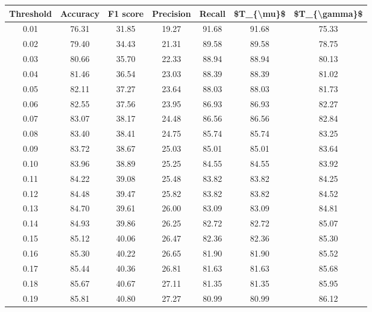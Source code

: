 \begin{tabular}{|c|c|c|c|c|c|c|}
\hline
 Threshold &  Accuracy &  F1 score &  Precision &  Recall &  \$T\_\{\textbackslash mu\}\$ &  \$T\_\{\textbackslash gamma\}\$ \\
\hline
      0.01 &     76.31 &     31.85 &      19.27 &   91.68 &      91.68 &         75.33 \\
      0.02 &     79.40 &     34.43 &      21.31 &   89.58 &      89.58 &         78.75 \\
      0.03 &     80.66 &     35.70 &      22.33 &   88.94 &      88.94 &         80.13 \\
      0.04 &     81.46 &     36.54 &      23.03 &   88.39 &      88.39 &         81.02 \\
      0.05 &     82.11 &     37.27 &      23.64 &   88.03 &      88.03 &         81.73 \\
      0.06 &     82.55 &     37.56 &      23.95 &   86.93 &      86.93 &         82.27 \\
      0.07 &     83.07 &     38.17 &      24.48 &   86.56 &      86.56 &         82.84 \\
      0.08 &     83.40 &     38.41 &      24.75 &   85.74 &      85.74 &         83.25 \\
      0.09 &     83.72 &     38.67 &      25.03 &   85.01 &      85.01 &         83.64 \\
      0.10 &     83.96 &     38.89 &      25.25 &   84.55 &      84.55 &         83.92 \\
      0.11 &     84.22 &     39.08 &      25.48 &   83.82 &      83.82 &         84.25 \\
      0.12 &     84.48 &     39.47 &      25.82 &   83.82 &      83.82 &         84.52 \\
      0.13 &     84.70 &     39.61 &      26.00 &   83.09 &      83.09 &         84.81 \\
      0.14 &     84.93 &     39.86 &      26.25 &   82.72 &      82.72 &         85.07 \\
      0.15 &     85.12 &     40.06 &      26.47 &   82.36 &      82.36 &         85.30 \\
      0.16 &     85.30 &     40.22 &      26.65 &   81.90 &      81.90 &         85.52 \\
      0.17 &     85.44 &     40.36 &      26.81 &   81.63 &      81.63 &         85.68 \\
      0.18 &     85.67 &     40.67 &      27.11 &   81.35 &      81.35 &         85.95 \\
      0.19 &     85.81 &     40.80 &      27.27 &   80.99 &      80.99 &         86.12 \\

\end{tabular}
